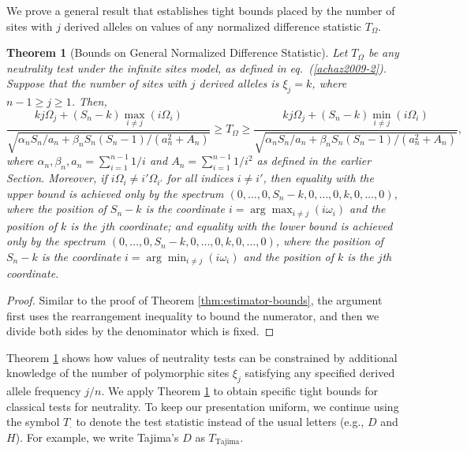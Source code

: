 \documentclass[lettersize, 10pt]{article}
\newtheorem{thm}{Theorem}
\begin{document}
We prove a general result that establishes tight bounds placed by the number of sites with $j$ derived alleles on values of any normalized difference statistic $T_\Omega$. 

\begin{thm}[Bounds on General Normalized Difference Statistic]\label{thm:test-bounds}
Let $T_\Omega$ be any neutrality test under the infinite sites model, as defined in eq.~(\ref{achaz2009-2}). Suppose that the number of sites with $j$ derived alleles is $\xi_j=k$, where $n-1\geqslant j\geqslant 1$. Then, 
\begin{equation}
\frac{kj\Omega_j + (S_n-k)\max_{i\neq j}(i\Omega_i)}{\sqrt{\alpha_n S_n/a_n +\beta_n S_n(S_n-1) / (a_n^2+A_n)}} \geqslant T_\Omega \geqslant \frac{kj\Omega_j + (S_n-k)\min_{i\neq j}(i\Omega_i)}{\sqrt{\alpha_n S_n/a_n +\beta_n S_n(S_n-1) / (a_n^2+A_n)}}, \label{test-bounds}
\end{equation}
where $\alpha_n,\beta_n,a_n=\sum_{i=1}^{n-1}1/i$ and $A_n=\sum_{i=1}^{n-1}1/i^2$ as defined in the earlier Section. Moreover, if $i\Omega_i\neq i'\Omega_{i'}$ for all indices $i\neq i'$, then equality with the upper bound is achieved only by the spectrum $(0,\ldots,0,S_n-k,0,\ldots,0,k,0,\ldots,0)$, where the position of $S_n-k$ is the coordinate $i=\arg\max_{i\neq j}(i\omega _i)$ and the position of $k$ is the $j$th coordinate; and equality with the lower bound is achieved only by the spectrum $(0,\ldots,0,S_n-k,0,\ldots,0,k,0,\ldots,0)$, where the position of $S_n-k$ is the coordinate $i=\arg\min_{i\neq j}(i\omega _i)$ and the position of $k$ is the $j$th coordinate.
\end{thm}

\begin{proof}
Similar to the proof of Theorem \ref{thm:estimator-bounds}, the argument first uses the rearrangement inequality to bound the numerator, and then we divide both sides by the denominator which is fixed. 
\end{proof}

Theorem \ref{thm:test-bounds} shows how values of neutrality tests can be constrained by additional knowledge of the number of polymorphic sites $\xi_j$ satisfying any specified derived allele frequency $j/n$. We apply Theorem \ref{thm:test-bounds} to obtain specific tight bounds for classical tests for neutrality. To keep our presentation uniform, we continue using the symbol $T_{\cdot}$ to denote the test statistic instead of the usual letters (e.g., $D$ and $H$). For example, we write Tajima's $D$ as $T_{\text{Tajima}}$. 
\end{document}
